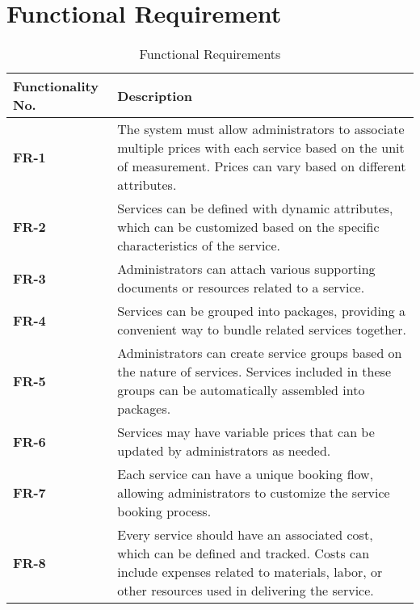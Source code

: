 \documentclass[12pt,a4paper]{article}
\begin{document}
\section{Functional Requirement}
\begin{table}[h]
\caption{Functional Requirements}
    \centering
    \begin{tabular}{|l|p{10cm}|}
    \hline
       \textbf{Functionality No.}&\textbf{Description} \\ %
       \hline
       \textbf{FR-1}&The system must allow administrators to associate multiple prices with each service based on the unit of measurement. Prices can vary based on different attributes.\\ %
       \hline
         \textbf{FR-2}&Services can be defined with dynamic attributes, which can be customized based on the specific characteristics of the service.\\ %
       \hline
       \textbf{FR-3}&Administrators can attach various supporting documents or resources related to a service. \\ %
       \hline
     
       \textbf{FR-4}&Services can be grouped into packages, providing a convenient way to bundle related services together.\\ %
       \hline
       \textbf{FR-5}&Administrators can create service groups based on the nature of services. Services included in these groups can be automatically assembled into packages.\\ %
       \hline
        \textbf{FR-6}&Services may have variable prices that can be updated by administrators as needed.\\ %
       \hline
        \textbf{FR-7}&Each service can have a unique booking flow, allowing administrators to customize the service booking process.\\ %
       \hline
        \textbf{FR-8}& Every service should have an associated cost, which can be defined and tracked. Costs can include expenses related to materials, labor, or other resources used in delivering the service.\\ %
       \hline
    \end{tabular}
\end{table}
\newpage
\end{document}
